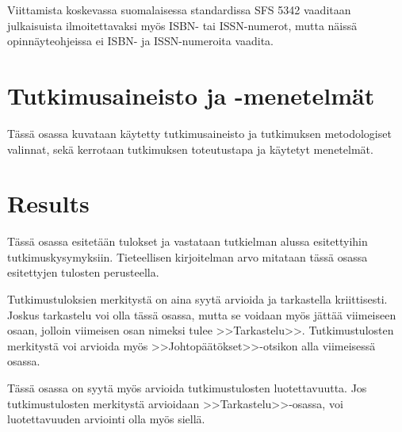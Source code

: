 \documentclass[english,12pt,a4paper,dvips]{article}
\begin{document}
Viittamista koskevassa suomalaisessa standardissa
SFS 5342 \cite{sfs} vaaditaan julkaisuista ilmoitettavaksi myös ISBN- tai
ISSN-numerot, mutta näissä opinnäyteohjeissa ei ISBN- ja 
ISSN-numeroita vaadita. 

\clearpage

\section{Tutkimusaineisto ja -menetelmät}

Tässä osassa kuvataan käytetty tutkimusaineisto ja
tutkimuksen metodologiset valinnat, sekä
kerrotaan tutkimuksen toteutustapa ja käytetyt menetelmät. 

\clearpage

\section{Results}

Tässä osassa esitetään tulokset ja vastataan tutkielman alussa
esitettyihin tutkimuskysymyksiin. Tieteellisen kirjoitelman
arvo mitataan tässä osassa esitettyjen tulosten perusteella. 

Tutkimustuloksien merkitystä on aina syytä arvioida ja tarkastella
kriittisesti.  Joskus tarkastelu voi olla tässä osassa, mutta se
voidaan myös jättää viimeiseen osaan, jolloin viimeisen osan nimeksi
tulee >>Tarkastelu>>. Tutkimustulosten merkitystä voi arvioida myös
>>Johtopäätökset>>-otsikon alla viimeisessä osassa. 

Tässä osassa on syytä myös arvioida tutkimustulosten luotettavuutta.
Jos tutkimustulosten merkitystä arvioidaan >>Tarkastelu>>-osassa,
voi luotettavuuden arviointi olla myös siellä. 

\clearpage

\end{document}
